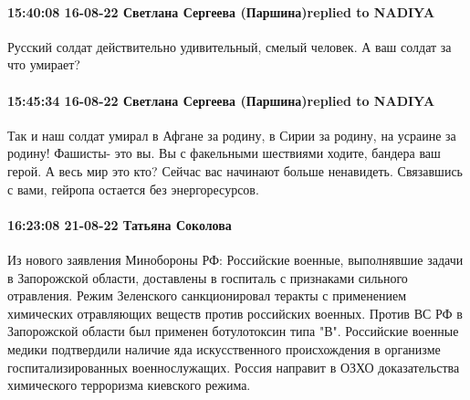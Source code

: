  
 
 
 
 

\paragraph{15:40:08 16-08-22 Светлана Сергеева (Паршина)replied to NADIYA}

Русский солдат действительно удивительный, смелый человек. А ваш солдат за что умирает?


\paragraph{15:45:34 16-08-22 Светлана Сергеева (Паршина)replied to NADIYA}

Так и наш солдат умирал в Афгане за родину, в Сирии за родину, на усраине за
родину! Фашисты- это вы. Вы с факельными шествиями ходите, бандера ваш герой. А
весь мир это кто? Сейчас вас начинают больше ненавидеть. Связавшись с вами,
гейропа остается без энергоресурсов.

\paragraph{16:23:08 21-08-22 Татьяна Соколова}

Из нового заявления Минобороны РФ:
Российские военные, выполнявшие задачи в Запорожской области, доставлены в госпиталь с признаками сильного отравления. Режим Зеленского санкционировал теракты с применением химических отравляющих веществ против российских военных. Против ВС РФ в Запорожской области был применен ботулотоксин типа "В".
Российские военные медики подтвердили наличие яда искусственного происхождения в организме госпитализированных военнослужащих. Россия направит в ОЗХО доказательства химического терроризма киевского режима.
